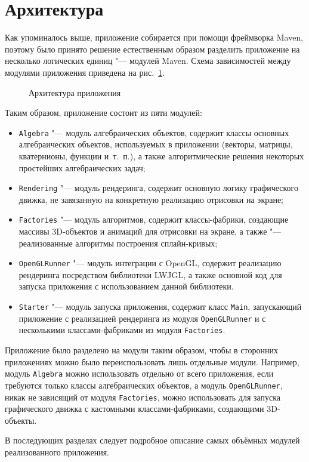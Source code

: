 \section{Архитектура}

Как упоминалось выше, приложение собирается при помощи фреймворка Maven, поэтому было принято решение естественным
образом разделить приложение на несколько логических единиц "--- модулей Maven. Схема зависимостей между модулями
приложения приведена на рис.~\ref{architecture}.

\begin{figure}[h]
\caption{Архитектура приложения}
\label{architecture}
\end{figure}

Таким образом, приложение состоит из пяти модулей:

\begin{itemize}

\item \texttt{Algebra} "--- модуль алгебраических объектов, содержит классы основных алгебраических объектов,
используемых в приложении (векторы, матрицы, кватернионы, функции и~т.~п.), а также алгоритмические решения некоторых
простейших алгебраических задач;
\item \texttt{Rendering} "--- модуль рендеринга, содержит основную логику графического движка, не завязанную
на конкретную реализацию отрисовки на экране;
\item \texttt{Factories} "--- модуль алгоритмов, содержит классы-фабрики, создающие массивы 3D-объектов и анимаций для
отрисовки на экране, а также "--- реализованные алгоритмы построения сплайн-кривых;
\item \texttt{OpenGLRunner} "--- модуль интеграции с OpenGL, содержит реализацию рендеринга посредством библиотеки
LWJGL, а также основной код для запуска приложения с использованием данной библиотеки.
\item \texttt{Starter} "--- модуль запуска приложения, содержит класс \texttt{Main}, запускающий
приложение с реализацией рендеринга из модуля \texttt{OpenGLRunner} и с несколькими классами-фабриками из модуля
\texttt{Factories}.
\end{itemize}

Приложение было разделено на модули таким образом, чтобы в сторонних приложениях
можно было переиспользовать лишь отдельные модули. Например, модуль \texttt{Algebra} можно
использовать отдельно от всего приложения, если требуются только классы алгебраических объектов, а модуль
\texttt{OpenGLRunner}, никак не зависящий от модуля \texttt{Factories}, можно использовать для запуска графического
движка с кастомными классами-фабриками, создающими 3D-объекты.

В последующих разделах следует подробное описание самых объёмных модулей реализованного приложения.
